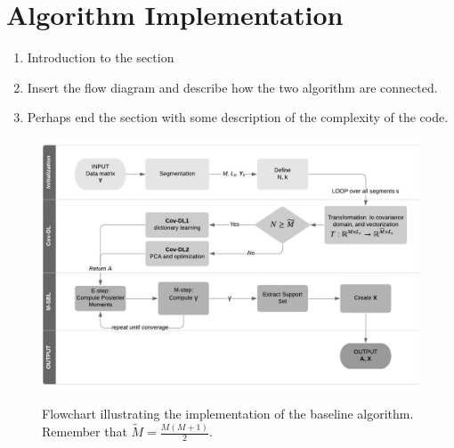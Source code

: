 \section{Algorithm Implementation}


\begin{enumerate}
\item Introduction to the section
\item Insert the flow diagram and describe how the two algorithm are connected.
\item Perhaps end the section with some description of the complexity of the code.
\end{enumerate}

\begin{figure}[H]
\centering
\includegraphics[scale=0.8]{figures/ch_6/baseline_flowchart.png}
\label{fig:flow}
\caption{Flowchart illustrating the implementation of the baseline algorithm. Remember that $\widetilde{M}=\frac{M(M+1)}{2}$.}
\end{figure}
\noindent
